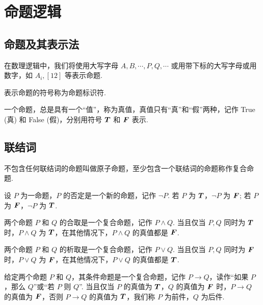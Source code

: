 \section{命题逻辑}

\subsection{命题及其表示法}

在数理逻辑中，我们将使用大写字母 $A,B,\cdots,P,Q,\cdots$ 或用带下标的大写字母或用数字，如 $A_i,[12]$ 等表示命题.

\begin{definition}[命题标识符]
    表示命题的符号称为命题标识符.
\end{definition}

\begin{definition}[真值]
    一个命题，总是具有一个“值”，称为真值，真值只有“真”和“假”两种，记作 True (真) 和 False (假)，分别用符号 $\vb*{T}$ 和 $\vb*{F}$ 表示.
\end{definition}

\subsection{联结词}

\begin{definition}[原子命题和复合命题]
    不包含任何联结词的命题叫做原子命题，至少包含一个联结词的命题称作复合命题.
\end{definition}

\begin{definition}[否定]
    设 $P$ 为一命题，$P$ 的否定是一个新的命题，记作 $\neg P$. 若 $P$ 为 $\vb*{T}$，$\neg P$ 为 $\vb*{F}$; 若 $P$ 为 $\vb*{F}$，$\neg P$ 为 $\vb*{T}$.
\end{definition}

\begin{definition}[合取]
    两个命题 $P$ 和 $Q$ 的合取是一个复合命题，记作 $P \wedge Q$. 当且仅当 $P,Q$ 同时为 $\vb*{T}$ 时，$P\wedge Q$ 为 $\vb*{T}$，在其他情况下，$P\wedge Q$ 的真值都是 $\vb*{F}$.
\end{definition}

\begin{definition}[析取]
    两个命题 $P$ 和 $Q$ 的析取是一个复合命题，记作 $P\vee Q$. 当且仅当 $P,Q$ 同时为 $\vb*{F}$ 时，$P\vee Q$ 为 $\vb*{F}$，在其他情况下，$P\vee Q$ 的真值都是 $\vb*{T}$.
\end{definition}

\begin{definition}[条件]
    给定两个命题 $P$ 和 $Q$，其条件命题是一个复合命题，记作 $P\to Q$，读作“如果 $P$，那么 $Q$”或“若 $P$ 则 $Q$”. 当且仅当 $P$ 的真值为 $\vb*{T}$，$Q$ 的真值为 $\vb*{F}$ 时，$P\to Q$ 的真值为 $\vb*{F}$，否则 $P\to Q$ 的真值为 $\vb*{T}$，我们称 $P$ 为前件，$Q$ 为后件.
\end{definition}

